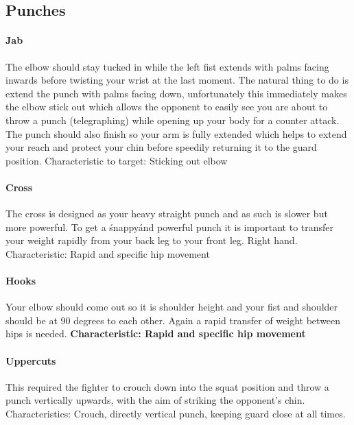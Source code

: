 \subsection{Punches}
\label{subsec:subsec03}
\paragraph{Jab}
The elbow should stay tucked in while the left fist extends with palms facing inwards before twisting your wrist at the last moment. The natural thing to do is extend the punch with palms facing down, unfortunately this immediately makes the elbow stick out which allows the opponent to easily see you are about to throw a punch (telegraphing) while opening up your body for a counter attack.
The punch should also finish so your arm is fully extended which helps to extend your reach and protect your chin before speedily returning it to the guard position.
Characteristic to target: Sticking out elbow

\paragraph{Cross}
The cross is designed as your heavy straight punch and as such is slower but more powerful. To get a \'snappy\' and powerful punch it is important to transfer your weight rapidly from your back leg to your front leg. Right hand. Characteristic: Rapid and specific hip movement

\paragraph{Hooks}
Your elbow should come out so it is shoulder height and your fist and shoulder should be at 90 degrees to each other. Again a rapid transfer of weight between hips is needed. {\bf Characteristic: Rapid and specific hip movement}

\paragraph{Uppercuts}
This required the fighter to crouch down into the squat position and throw a punch vertically upwards, with the aim of striking the opponent's chin.
Characteristics: Crouch, directly vertical punch, keeping guard close at all times.

